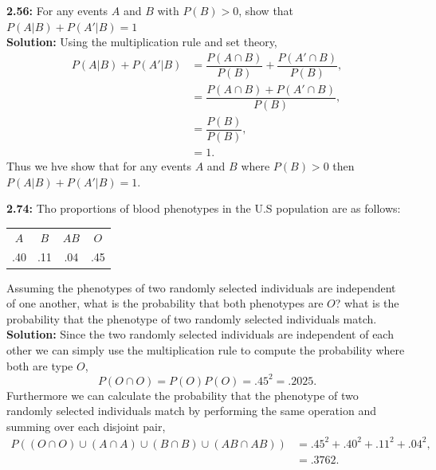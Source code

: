 \documentclass[12pt]{article}
\theoremstyle{homework}
\begin{document}
\textbf{2.56:} For any events $A$ and $B$ with $P(B) > 0$, show that $P(A|B) + P(A'|B) = 1$\\

\textbf{Solution:} Using the multiplication rule and set theory,
\begin{align*}
  P(A|B) + P(A'|B) &= \dfrac{P(A \cap B)}{P(B)} + \dfrac{P(A' \cap B)}{P(B)},\\
  &= \dfrac{P(A \cap B) + P(A' \cap B)}{P(B)},\\
  &= \dfrac{P(B)}{P(B)},\\
  &= 1. 
\end{align*}
Thus we hve show that for any events $A$ and $B$ where $P(B) > 0$ then $P(A|B) + P(A'|B) = 1$.
\vspace{1in}







\textbf{2.74:} Tho proportions of blood phenotypes in the U.S population are as follows:
 \begin{center}
\begin{tabular}{ c c c c}
  $A$ & $B$ & $AB$ & $O$ \\
  .40 & .11 & .04 & .45 \\
\end{tabular}
\end{center}
Assuming the phenotypes of two randomly selected individuals are independent of one another, what is the probability that both
phenotypes are $O$? what is the probability that the phenotype of two randomly selected individuals match.\\

\textbf{Solution:} Since the two randomly selected individuals are independent of each other we can simply use the multiplication rule to compute the
probability where both are type $O$,
\begin{equation*}
  P(O\cap O) = P(O)P(O) = .45^2 = .2025.
\end{equation*}
Furthermore we can calculate the probability that the phenotype of two randomly selected individuals match by performing the same operation and summing over each disjoint pair,
\begin{align*}
  P((O\cap O) \cup (A\cap A) \cup (B\cap B) \cup (AB\cap AB)) &= .45^2 + .40^2 + .11^2 +.04^2,\\
  &= .3762.
\end{align*}
\vspace{1in}
\end{document}
